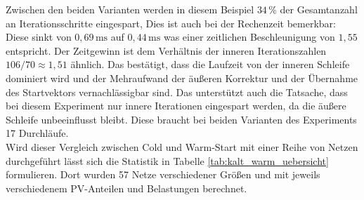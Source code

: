 
Zwischen den beiden Varianten werden in diesem Beispiel $34\,\%$ der Gesamtanzahl an Iterationsschritte eingespart,
Dies ist auch bei der Rechenzeit bemerkbar: Diese sinkt von $0{,}69\,\mathrm{ms}$ auf $0{,}44\,\mathrm{ms}$ was einer zeitlichen Beschleunigung von $1{,}55$ entspricht. 
Der Zeitgewinn ist dem Verhältnis der inneren Iterationszahlen $106/70 \approx 1{,}51$ ähnlich.
Das bestätigt, dass die Laufzeit von der inneren Schleife dominiert wird und der Mehraufwand der äußeren Korrektur und der Übernahme des Startvektors vernachlässigbar sind.
Das unterstützt auch die Tatsache, dass bei diesem Experiment nur innere Iterationen eingespart werden, da die äußere Schleife unbeeinflusst bleibt.
Diese braucht bei beiden Varianten des Experiments 17 Durchläufe.\\

Wird dieser Vergleich zwischen Cold und Warm-Start mit einer Reihe von Netzen durchgeführt lässt sich die Statistik in Tabelle \ref{tab:kalt_warm_uebersicht} formulieren.
Dort wurden 57 Netze verschiedener Größen und mit jeweils verschiedenem PV-Anteilen und Belastungen berechnet.\\




